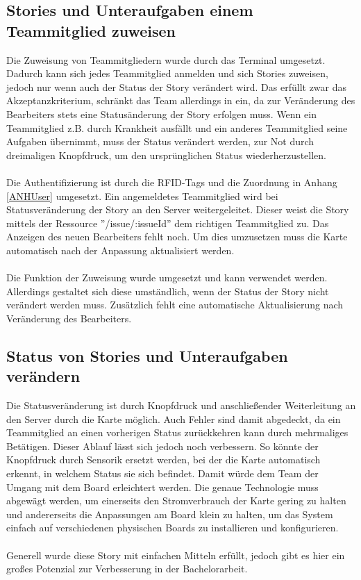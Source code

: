 \documentclass[12pt,titlepage]{scrartcl}
\begin{document}
			\subsection{Stories und Unteraufgaben einem Teammitglied zuweisen}
			Die Zuweisung von Teammitgliedern wurde durch das Terminal umgesetzt. Dadurch kann sich jedes Teammitglied anmelden und sich Stories zuweisen, jedoch nur wenn auch der Status der Story verändert wird. Das erfüllt zwar das Akzeptanzkriterium, schränkt das Team allerdings in ein, da zur Veränderung des Bearbeiters stets eine Statusänderung der Story erfolgen muss. Wenn ein Teammitglied z.B. durch Krankheit ausfällt und ein anderes Teammitglied seine Aufgaben übernimmt, muss der Status verändert werden, zur Not durch dreimaligen Knopfdruck, um den ursprünglichen Status wiederherzustellen. \\ \\
			Die Authentifizierung ist durch die RFID-Tags und die Zuordnung in Anhang \ref{ANHUser} umgesetzt. Ein angemeldetes Teammitglied wird bei Statusveränderung der Story an den Server weitergeleitet. Dieser weist die Story mittels der Ressource ''/issue/:issueId'' dem richtigen Teammitglied zu. Das Anzeigen des neuen Bearbeiters fehlt noch. Um dies umzusetzen muss die Karte automatisch nach der Anpassung aktualisiert werden. \\ \\
			Die Funktion der Zuweisung wurde umgesetzt und kann verwendet werden. Allerdings gestaltet sich diese umständlich, wenn der Status der Story nicht verändert werden muss. Zusätzlich fehlt eine automatische Aktualisierung nach Veränderung des Bearbeiters. 
			\subsection{Status von Stories und Unteraufgaben verändern}
			Die Statusveränderung ist durch Knopfdruck und anschließender Weiterleitung an den Server durch die Karte möglich. Auch Fehler sind damit abgedeckt, da ein Teammitglied an einen vorherigen Status zurückkehren kann durch mehrmaliges Betätigen. Dieser Ablauf lässt sich jedoch noch verbessern. So könnte der Knopfdruck durch Sensorik ersetzt werden, bei der die Karte automatisch erkennt, in welchem Status sie sich befindet. Damit würde dem Team der Umgang mit dem Board erleichtert werden. Die genaue Technologie muss abgewägt werden, um einerseits den Stromverbrauch der Karte gering zu halten und andererseits die Anpassungen am Board klein zu halten, um das System einfach auf verschiedenen physischen Boards zu installieren und konfigurieren. \\ \\
			Generell wurde diese Story mit einfachen Mitteln erfüllt, jedoch gibt es hier ein großes Potenzial zur Verbesserung in der Bachelorarbeit.
	\newpage	
\end{document}
